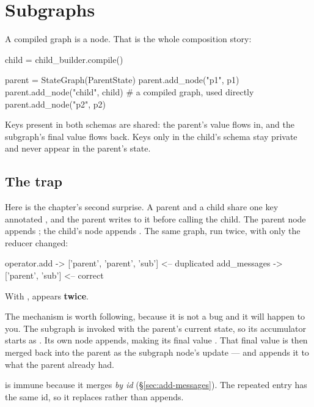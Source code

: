 \section{Subgraphs}
\label{sec:subgraphs}

A compiled graph is a node. That is the whole composition story:

\begin{python}[caption={A graph used as a node}, label={lst:subgraph}]
child = child_builder.compile()

parent = StateGraph(ParentState)
parent.add_node("p1", p1)
parent.add_node("child", child)      # a compiled graph, used directly
parent.add_node("p2", p2)
\end{python}

Keys present in both schemas are shared: the parent's value flows in, and the
subgraph's final value flows back. Keys only in the child's schema stay private
and never appear in the parent's state.

\subsection{The trap}
\label{sec:subgraph-duplication}

Here is the chapter's second surprise. A parent and a child share one key
annotated , and the parent writes to it before calling the
child. The parent node appends ; the child's node appends
. The same graph, run twice, with only the reducer changed:

\begin{console}
operator.add  ->  ['parent', 'parent', 'sub']       <-- duplicated
add_messages  ->  ['parent', 'sub']                 <-- correct
\end{console}

With ,  appears \textbf{twice}.

The mechanism is worth following, because it is not a bug and it will happen to
you. The subgraph is invoked with the parent's current state, so its accumulator
starts as \code{['parent']}. Its own node appends, making its final value
. That final value is then merged back into the parent as
the subgraph node's update --- and  appends it to what the
parent already had.

 is immune because it merges \emph{by id}
(\S\ref{sec:add-messages}). The repeated entry has the same id, so it replaces
rather than appends.

